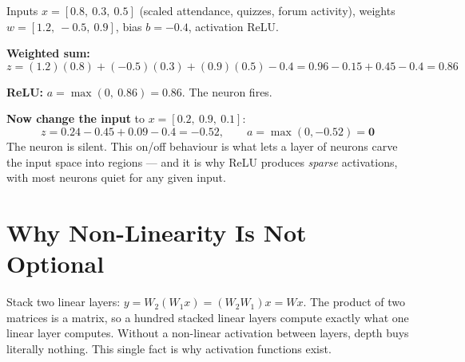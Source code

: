 \begin{worked}
Inputs $x = [0.8,\ 0.3,\ 0.5]$ (scaled attendance, quizzes, forum activity), weights
$w = [1.2,\ -0.5,\ 0.9]$, bias $b = -0.4$, activation ReLU.

\smallskip
\textbf{Weighted sum:}
\[
z = (1.2)(0.8) + (-0.5)(0.3) + (0.9)(0.5) - 0.4
  = 0.96 - 0.15 + 0.45 - 0.4 = 0.86
\]

\textbf{ReLU:} $a = \max(0,\ 0.86) = \mathbf{0.86}$. The neuron fires.

\smallskip
\textbf{Now change the input} to $x = [0.2,\ 0.9,\ 0.1]$:
\[
z = 0.24 - 0.45 + 0.09 - 0.4 = -0.52,
\qquad a = \max(0, -0.52) = \mathbf{0}
\]
The neuron is silent. This on/off behaviour is what lets a layer of neurons carve
the input space into regions --- and it is why ReLU produces \emph{sparse}
activations, with most neurons quiet for any given input.
\end{worked}

\section{Why Non-Linearity Is Not Optional}

\begin{alertbox}
Stack two linear layers: $y = W_2(W_1 x) = (W_2 W_1)x = W x$. The product of two
matrices is a matrix, so a hundred stacked linear layers compute exactly what one
linear layer computes. Without a non-linear activation between layers, depth buys
literally nothing. This single fact is why activation functions exist.
\end{alertbox}

